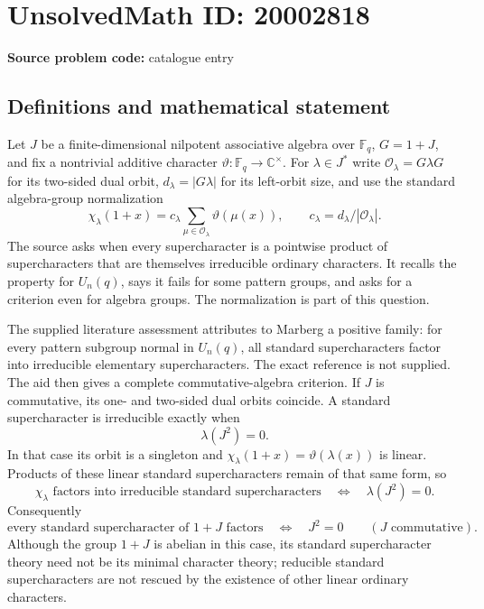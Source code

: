 \documentclass[11pt]{article}
\newcommand{\C}{\mathbb{C}}
\newcommand{\F}{\mathbb{F}}
\begin{document}
\section*{UnsolvedMath ID: 20002818}
\textbf{Source problem code:} catalogue entry
\subsection{Definitions and mathematical statement}
Let $J$ be a finite-dimensional nilpotent associative algebra over $\F_q$, $G=1+J$, and fix a nontrivial additive character $\vartheta:\F_q\to\C^\times$. For $\lambda\in J^*$ write $\mathcal O_\lambda=G\lambda G$ for its two-sided dual orbit, $d_\lambda=|G\lambda|$ for its left-orbit size, and use the standard algebra-group normalization
\[
 \chi_\lambda(1+x)
   =c_\lambda\sum_{\mu\in\mathcal O_\lambda}\vartheta(\mu(x)),
 \qquad c_\lambda=d_\lambda/|\mathcal O_\lambda|.
\]
The source asks when every supercharacter is a pointwise product of supercharacters that are themselves irreducible ordinary characters. It recalls the property for $U_n(q)$, says it fails for some pattern groups, and asks for a criterion even for algebra groups. The normalization is part of this question.

The supplied literature assessment attributes to Marberg a positive family: for every pattern subgroup normal in $U_n(q)$, all standard supercharacters factor into irreducible elementary supercharacters. The exact reference is not supplied. The aid then gives a complete commutative-algebra criterion. If $J$ is commutative, its one- and two-sided dual orbits coincide. A standard supercharacter is irreducible exactly when
\[
 \lambda(J^2)=0.
\]
In that case its orbit is a singleton and $\chi_\lambda(1+x)=\vartheta(\lambda(x))$ is linear. Products of these linear standard supercharacters remain of that same form, so
\[
 \chi_\lambda\text{ factors into irreducible standard supercharacters}
 \quad\Longleftrightarrow\quad\lambda(J^2)=0.
\]
Consequently
\[
 \text{every standard supercharacter of }1+J\text{ factors}
 \quad\Longleftrightarrow\quad J^2=0
 \qquad(J\text{ commutative}).
\]
Although the group $1+J$ is abelian in this case, its standard supercharacter theory need not be its minimal character theory; reducible standard supercharacters are not rescued by the existence of other linear ordinary characters.
\end{document}
